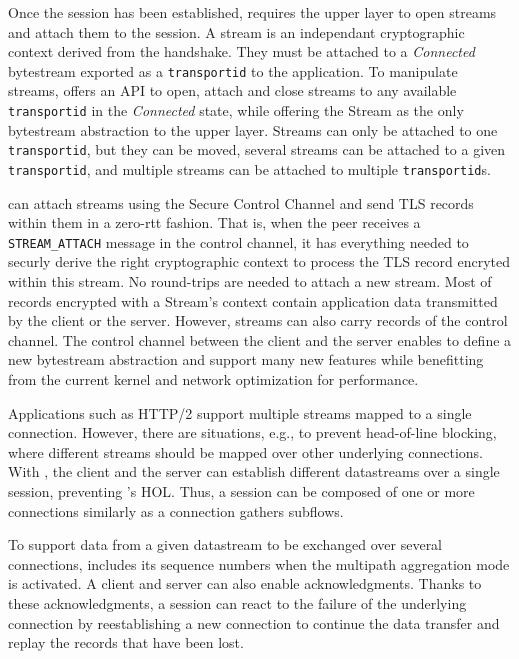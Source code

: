 Once the \tcpls session has been established, \tcpls requires the upper layer to
open streams and attach them to the session. A stream is an independant
cryptographic context derived from the \tcpls handshake. They must be attached to a
\textit{Connected} \tcp bytestream exported as a \texttt{transportid} to the
application. To manipulate streams, \tcpls offers an API to open, attach
and close streams to any available \texttt{transportid} in the \textit{Connected} state,
while offering the Stream as the only bytestream abstraction to the upper layer.
Streams can only be attached to one \texttt{transportid}, but they can be moved,
several streams can be attached to a given \texttt{transportid}, and multiple
streams can be attached to multiple \texttt{transportid}s.

\tcpls can attach streams using the Secure Control Channel and send TLS records
within them in a zero-rtt fashion. That is, when the peer receives a
\texttt{STREAM\_ATTACH} message in the control channel, it has everything needed
to securly derive the right cryptographic context to process the TLS record
encryted within this stream. No round-trips are needed to attach a new stream.
Most of records encrypted with a Stream's context contain application data
transmitted by the client or the server. However, streams can also carry records
of the control channel. The control channel between the client and the server
enables \tcpls to define a new bytestream abstraction and support many new
features while benefitting from the current kernel and network optimization for
\tcp performance.

Applications such as HTTP/2 support multiple streams mapped to a single \tcp
connection. However, there are situations, e.g., to prevent head-of-line
blocking, where different streams should be mapped over other underlying \tcp
connections. With \tcpls, the client and the server can establish different
datastreams over a single \tcpls session, preventing \tcp's HOL. Thus, a
\tcpls session can be composed of one or more \tcp connections similarly as a
\mptcp connection gathers subflows.

To support data from a given datastream to be exchanged over several \tcp
connections, \tcpls includes its sequence numbers when the multipath aggregation
mode is activated. A client and server can also enable acknowledgments. Thanks
to these \tcpls acknowledgments, a \tcpls session can react to the failure of
the underlying \tcp connection by reestablishing a new \tcp connection to
continue the data transfer and replay the records that have been lost.

